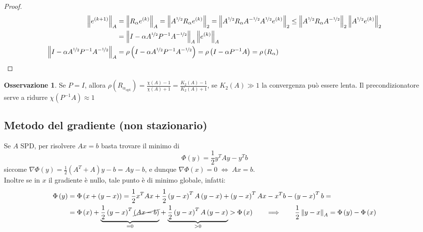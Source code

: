 \documentclass[a4paper,10pt]{article}
\theoremstyle{definition}
\theoremstyle{indentdefinition}
\theoremstyle{indenttheorem}
\theoremstyle{myremark}
\newtheorem*{rem*}{Osservazione}
\theoremstyle{indentgeneral}
\theoremstyle{plain}
\theoremstyle{plain}
\begin{document}
\begin{proof}
\begin{align*}
\left\Vert e^{\left(k+1\right)}\right\Vert _{A} & =\left\Vert R_{\alpha}e^{\left(k\right)}\right\Vert _{A}=\left\Vert A^{\nicefrac{1}{2}}R_{\alpha}e^{\left(k\right)}\right\Vert _{2}=\left\Vert A^{\nicefrac{1}{2}}R_{\alpha}A^{-\nicefrac{1}{2}}A^{\nicefrac{1}{2}}e^{\left(k\right)}\right\Vert _{2}\leq\left\Vert A^{\nicefrac{1}{2}}R_{\alpha}A^{-\nicefrac{1}{2}}\right\Vert _{2}\left\Vert A^{\nicefrac{1}{2}}e^{\left(k\right)}\right\Vert _{2}\\
 & =\left\Vert I-\alpha A^{\nicefrac{1}{2}}P^{-1}A^{-\nicefrac{1}{2}}\right\Vert _{A}\left\Vert e^{\left(k\right)}\right\Vert _{A}\\
\left\Vert I-\alpha A^{\nicefrac{1}{2}}P^{-1}A^{-\nicefrac{1}{2}}\right\Vert _{A} & =\rho\left(I-\alpha A^{\nicefrac{1}{2}}P^{-1}A^{-\nicefrac{1}{2}}\right)=\rho\left(I-\alpha P^{-1}A\right)=\rho\left(R_{\alpha}\right)
\end{align*}
\end{proof}
\begin{rem*}
Se $P=I$, allora $\rho\left(R_{\alpha_{\text{opt}}}\right)=\frac{\chi\left(A\right)-1}{\chi\left(A\right)+1}=\frac{K_{2}\left(A\right)-1}{K_{2}\left(A\right)+1}$,
se $K_{2}\left(A\right)\gg1$ la convergenza può essere lenta. Il
precondizionatore serve a ridurre $\chi\left(P^{-1}A\right)\approx1$
\end{rem*}

\subsection{Metodo del gradiente (non stazionario)}

Se $A$ SPD, per risolvere $Ax=b$ basta trovare il minimo di $$\Phi\left(y\right)=\frac{1}{2}y^{T}Ay-y^{T}b$$
siccome $\nabla\Phi\left(y\right)=\frac{1}{2}\left(A^{T}+A\right)y-b=Ay-b$,
e dunque $\nabla\Phi\left(x\right)=0\;\Leftrightarrow\;Ax=b$.\\
Inoltre se in $x$ il gradiente è nullo, tale punto è di minimo globale, infatti: 
\begin{align*}
\Phi\left(y\right) & =\Phi\left(x+\left(y-x\right)\right)=\frac{1}{2}x^{T}Ax+\frac{1}{2}\left(y-x\right)^{T}A\left(y-x\right)+\left(y-x\right)^{T}Ax-x^{T}b-\left(y-x\right)^{T}b=\\
 & =\Phi\left(x\right)+\underset{=0}{\underbrace{\frac{1}{2}\left(y-x\right)^{T}\cancel{\left(Ax-b\right)}}}+\underset{>0}{\underbrace{\frac{1}{2}\left(y-x\right)^{T}A\left(y-x\right)}}>\Phi\left(x\right)\qquad\Longrightarrow\qquad\frac{1}{2}\left\Vert y-x\right\Vert _{A}=\Phi\left(y\right)-\Phi\left(x\right)
\end{align*}
\end{document}
